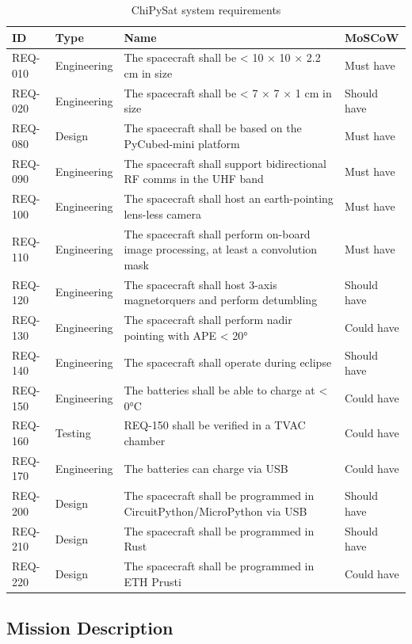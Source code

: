 \documentclass[a4paper,nobib,justified,final]{tufte-book}
\begin{document}
\begin{table}[]
\begin{tabularx}{\textwidth}{@{}llXl@{}}
\toprule
\textbf{ID} & \textbf{Type} & \textbf{Name} & \textbf{MoSCoW} \\ \midrule
REQ-010 & Engineering & The spacecraft shall be < 10 × 10 × 2.2 cm in size & Must have \\
REQ-020 & Engineering & The spacecraft shall be < 7 × 7 × 1 cm in size & Should have \\
REQ-080 & Design & The spacecraft shall be based on the PyCubed-mini platform & Must have \\
REQ-090 & Engineering & The spacecraft shall support bidirectional RF comms in the \acs{UHF}   band & Must have \\
REQ-100 & Engineering & The spacecraft shall host an earth-pointing lens-less camera & Must have \\
REQ-110 & Engineering & The spacecraft shall   perform on-board image processing, at least a convolution mask & Must have \\
REQ-120 & Engineering & The spacecraft shall host 3-axis magnetorquers and perform  detumbling & Should have \\
REQ-130 & Engineering & The spacecraft shall perform nadir pointing with \acs{APE} < 20° & Could have \\
REQ-140 & Engineering & The spacecraft shall operate during eclipse & Should have \\
REQ-150 & Engineering & The batteries shall be able to charge at < 0°C & Could have \\
REQ-160 & Testing & REQ-150 shall be verified in a \acs{TVAC} chamber & Could have \\
REQ-170 & Engineering & The batteries can charge via \acs{USB} & Could have \\
REQ-200 & Design & The spacecraft shall be   programmed in CircuitPython/MicroPython via USB & Should have \\
REQ-210 & Design & The spacecraft shall be programmed in Rust & Should have \\
REQ-220 & Design & The spacecraft shall be programmed in ETH Prusti & Could have \\ \bottomrule
\end{tabularx}
\caption{ChiPySat system requirements}
\end{table}

\subsection{Mission Description}
\end{document}
